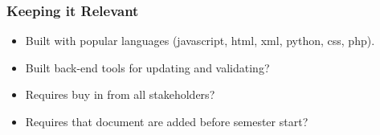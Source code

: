 \documentclass{beamer} %
\begin{document}
	


  \begin{frame}
    \frametitle{Keeping it Relevant}
    \begin{itemize}
    		\item Built with popular languages (javascript, html, xml, python, css, php).
    		\item Built back-end tools for updating and validating?
    		\item Requires buy in from all stakeholders?
    		\item Requires that document are added before semester start?
    \end{itemize}
  \end{frame}
\end{document}
